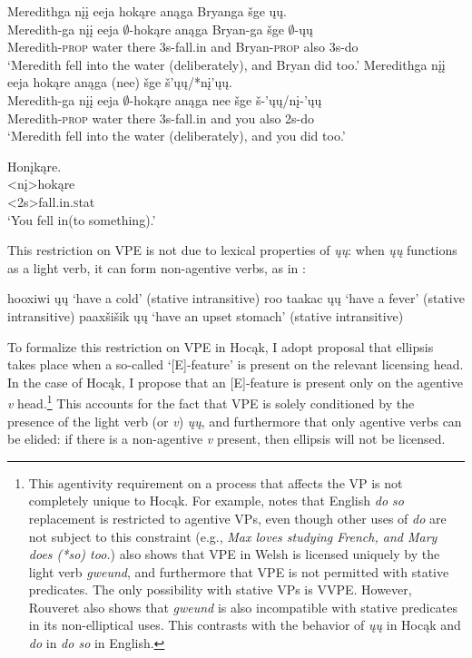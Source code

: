 \documentclass[output=paper]{LSP/langsci}
\begin{document}
\ea\label{ex:johnson:21}
\ea\label{ex:johnson:21a}
\glll Meredithga nįį eeja hokąre anąga Bryanga šge ųų.\\
Meredith-ga nįį eeja $\emptyset$-hokąre anąga Bryan-ga šge $\emptyset$-ųų\\
Meredith-\textsc{prop} water there {\textsc 3s}-fall.in and Bryan-\textsc{prop} also {\textsc 3s}-do\\
\trans `Meredith fell into the water (deliberately), and Bryan did too.'
\ex\label{ex:johnson:21b}
\glll Meredithga nįį eeja hokąre anąga (nee) šge š'ųų/*nį'ųų.\\
Meredith-ga nįį eeja $\emptyset$-hokąre anąga nee šge š-'ųų/nį-'ųų\\
Meredith-\textsc{prop} water there {\textsc 3s}-fall.in and you also {\textsc 2s}-do\\
\trans `Meredith fell into the water (deliberately), and you did too.'
\z
\z

\ea\label{ex:johnson:22}
\glll Honįkąre.\\
<nį>hokąre\\
<{\textsc 2s}>fall.in.{\textsc stat}\\
\trans `You fell in(to something).' \citep{Hartmann2012}
\z
	
This restriction on VPE is not due to lexical properties of \emph{ųų}: when \emph{ųų} functions as a light verb, it can form non-agentive verbs, as in :


\ea\label{ex:johnson:23}
\ea
hooxiwi ųų `have a cold' (stative intransitive)
\vspace{12pt}
\ex
roo taakac ųų `have a fever' (stative intransitive)
\vspace{12pt}
\ex
paaxšišik ųų `have an upset stomach' (stative intransitive)\\
\citep{Hartmann2012}
\z
\z

To formalize this restriction on VPE in Hocąk, I adopt  proposal that ellipsis takes place when a so-called `[E]-feature' is present on the relevant licensing head. In the case of Hocąk, I propose that an [E]-feature is present only on the agentive \emph{v} head.\footnote{This agentivity requirement on a process that affects the VP is not completely unique to Hocąk. For example, \citet{Hallman2004} notes that English \emph{do so} replacement is restricted to agentive VPs, even though other uses of \emph{do} are not subject to this constraint (e.g., \emph{Max loves studying French, and Mary does (*so) too.}) \citet{Rouveret2012} also shows that VPE in Welsh is licensed uniquely by the light verb \emph{gweund}, and furthermore that VPE is not permitted with stative predicates. The only possibility with stative VPs is VVPE. However, Rouveret also shows that \emph{gweund} is also incompatible with stative predicates in its non-elliptical uses. This contrasts with the behavior of \emph{ųų} in Hocąk and \emph{do} in \emph{do so} in English.}  This accounts for the fact that VPE is solely conditioned by the presence of the light verb (or \emph{v}) \emph{ųų}, and furthermore that only agentive verbs can be elided: if there is a non-agentive \emph{v} present, then ellipsis will not be licensed. 
\end{document}
